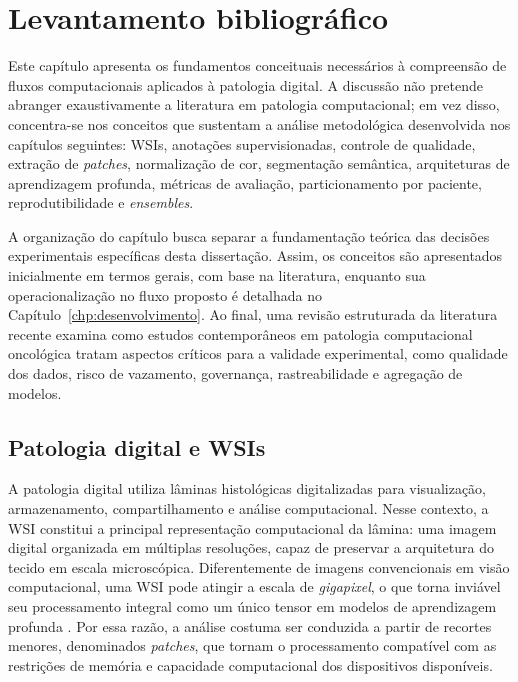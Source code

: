 \chapter{Levantamento bibliográfico}\label{chp:levantamento}

Este capítulo apresenta os fundamentos conceituais necessários à compreensão de
fluxos computacionais aplicados à patologia digital. A discussão não pretende
abranger exaustivamente a literatura em patologia computacional; em vez disso,
concentra-se nos conceitos que sustentam a análise metodológica desenvolvida nos
capítulos seguintes: WSIs, anotações supervisionadas, controle de qualidade,
extração de \textit{patches}, normalização de cor, segmentação semântica,
arquiteturas de aprendizagem profunda, métricas de avaliação, particionamento por
paciente, reprodutibilidade e \textit{ensembles}.

A organização do capítulo busca separar a fundamentação teórica das decisões
experimentais específicas desta dissertação. Assim, os conceitos são apresentados
inicialmente em termos gerais, com base na literatura, enquanto sua
operacionalização no fluxo proposto é detalhada no Capítulo~\ref{chp:desenvolvimento}.
Ao final, uma revisão estruturada da literatura recente examina como estudos
contemporâneos em patologia computacional oncológica tratam aspectos críticos
para a validade experimental, como qualidade dos dados, risco de vazamento,
governança, rastreabilidade e agregação de modelos.

\section{Patologia digital e WSIs}\label{sec:patologia_digital_wsi}

A patologia digital utiliza lâminas histológicas digitalizadas para visualização,
armazenamento, compartilhamento e análise computacional. Nesse contexto, a WSI
constitui a principal representação computacional da lâmina: uma imagem digital
organizada em múltiplas resoluções, capaz de preservar a arquitetura do tecido em
escala microscópica. Diferentemente de imagens convencionais em visão
computacional, uma WSI pode atingir a escala de \textit{gigapixel}, o que torna
inviável seu processamento integral como um único tensor em modelos de
aprendizagem profunda \cite{khened2021generalized,munozaguirre2020pyhist}. Por
essa razão, a análise costuma ser conduzida a partir de recortes menores,
denominados \textit{patches}, que tornam o processamento compatível com as
restrições de memória e capacidade computacional dos dispositivos disponíveis.


